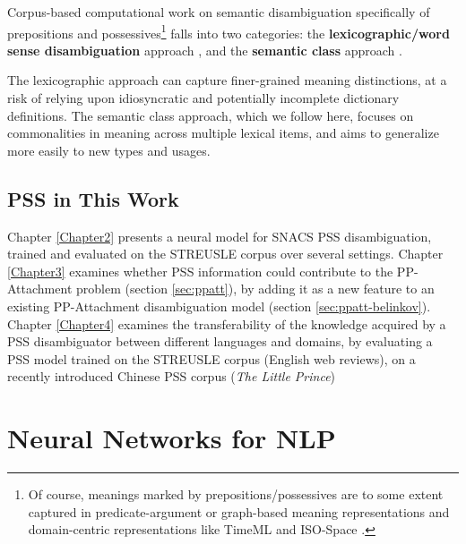 Corpus-based computational work on semantic disambiguation specifically of prepositions and possessives\footnote{Of course, meanings marked by prepositions\slash possessives are to some extent captured in predicate-argument or graph-based meaning representations \citep[e.g.,][]{palmer-05,framenet,oepen-16,amr} and domain-centric representations like TimeML and \mbox{ISO-Space} \citep{timeml,isospace}.} %
falls into two categories: 
the \textbf{lexicographic\slash word sense disambiguation} approach \citep{litkowski-05,litkowski-07,litkowski-14,ye-07,prepnet,dahlmeier-09,tratz-09,hovy-10,hovy-11,tratz-13},
and the \textbf{semantic class} approach \citep[see also \citealp{muller-12} for German]{moldovan-04,badulescu-09,ohara-09,srikumar-11,srikumar-13,schneider-15,schneider-16,hwang-17}.


The lexicographic approach can capture finer-grained meaning distinctions, at a risk of relying upon idiosyncratic and potentially incomplete dictionary definitions. 
The semantic class approach, which we follow here, focuses on commonalities in meaning across multiple lexical items, and aims to generalize more easily to new types and usages.


\subsection{PSS in This Work}

Chapter \ref{Chapter2} presents a neural model for SNACS PSS disambiguation, trained and evaluated on the STREUSLE corpus over several settings. Chapter \ref{Chapter3} examines whether PSS information could contribute to the PP-Attachment problem (section \ref{sec:ppatt}), by adding it as a new feature to an existing PP-Attachment disambiguation model (section \ref{sec:ppatt-belinkov}). Chapter \ref{Chapter4} examines the transferability of the knowledge acquired by a PSS disambiguator between different languages and domains, by evaluating a PSS model trained on the STREUSLE corpus (English web reviews), on a recently introduced Chinese PSS corpus (\textit{The Little Prince})

\pagebreak

\section{Neural Networks for NLP}

